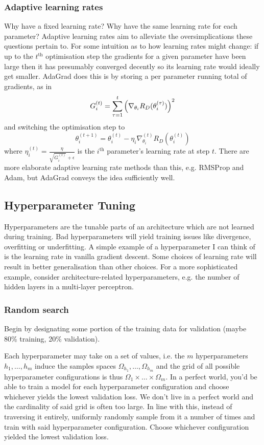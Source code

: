 \documentclass[11pt]{article}
\begin{document}
\subsubsection{Adaptive learning rates}
Why have a fixed learning rate? Why have the same learning rate for each parameter? Adaptive learning rates aim to alleviate the oversimplications these questions pertain to. For some intuition as to how learning rates might change: if up to the $t^{\text{th}}$ optimisation step the gradients for a given parameter have been large then it has presumably converged decently so its learning rate would ideally get smaller. AdaGrad does this is by storing a per parameter running total of gradients, as in
$$
G_i^{(t)}
=
\sum_{\tau=1}^t\left(\nabla_{\theta_i}R_D(\theta_i^{(\tau)})\right)^2
$$
and switching the optimisation step to
$$
\theta_i^{(t+1)}
=
\theta_i^{(t)}-\eta_i\nabla_{\theta_i}^{(t)}R_D(\theta_i^{(t)})
$$
where $\eta_i^{(t)}=\frac{\eta}{\sqrt{G_i^{(t)}}+\epsilon}$ is the $i^{\text{th}}$ parameter's learning rate at step $t$. There are more elaborate adaptive learning rate methods than this, e.g. RMSProp and Adam, but AdaGrad conveys the idea sufficiently well.

\subsection{Hyperparameter Tuning}
Hyperparameters are the tunable parts of an architecture which are not learned during training. Bad hyperparameters will yield training issues like divergence, overfitting or underfitting. A simple example of a hyperparameter I can think of is the learning rate in vanilla gradient descent. Some choices of learning rate will result in better generalisation than other choices. For a more sophisticated example, consider architecture-related hyperparameters, e.g. the number of hidden layers in a multi-layer perceptron.

\subsubsection{Random search}
Begin by designating some portion of the training data for validation (maybe 80\% training, 20\% validation). 

Each hyperparameter may take on a set of values, i.e. the $m$ hyperparameters $h_1,\dots,h_m$ induce the samples spaces $\Omega_{h_1},\dots,\Omega_{h_m}$ and the grid of all possible hyperparameter configurations is thus $\Omega_1\times\dots\times\Omega_m$. In a perfect world, you'd be able to train a model for each hyperparameter configuration and choose whichever yields the lowest validation loss. We don't live in a perfect world and the cardinality of said grid is often too large. In line with this, instead of traversing it entirely, uniformly randomly sample from it a number of times and train with said hyperparameter configuration. Choose whichever configuration yielded the lowest validation loss.
\end{document}
